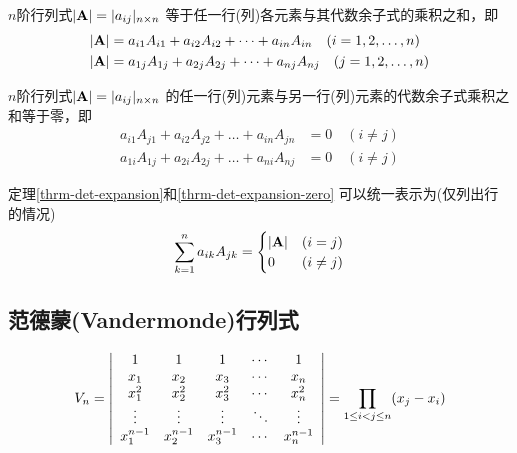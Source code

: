 \begin{theorem}[按行(列)展开] \label{thrm-det-expansion}
  $n$阶行列式$|\mmA|=|a_{ij}|_{n\times n}$
  等于任一行(列)各元素与其代数余子式的乘积之和，即
  \begin{align*}
  |\mmA| &= a_{i1}A_{i1}+a_{i2}A_{i2}+\dots+a_{in}A_{in}\quad(i=1,2,\dots,n) \\
  |\mmA| &= a_{1j}A_{1j}+a_{2j}A_{2j}+\dots+a_{nj}A_{nj}\quad(j=1,2,\dots,n)
  \end{align*}
\end{theorem}

\begin{theorem} \label{thrm-det-expansion-zero}
  $n$阶行列式$|\mmA|=|a_{ij}|_{n\times n}$
  的任一行(列)元素与另一行(列)元素的代数余子式乘积之和等于零，即
  \begin{align*}
    a_{i1}A_{j1}+a_{i2}A_{j2}+\dots+a_{in}A_{jn} &= 0\quad(i\neq j) \\
    a_{1i}A_{1j}+a_{2i}A_{2j}+\dots+a_{ni}A_{nj} &= 0\quad(i\neq j)
  \end{align*}
\end{theorem}

\begin{remark}
  定理\ref{thrm-det-expansion}和\ref{thrm-det-expansion-zero}
  可以统一表示为(仅列出行的情况)
  \begin{displaymath}
  \sum_{k=1}^{n}a_{ik}A_{jk} = \begin{cases}
    |\mmA| & (i=j) \\
    0      & (i\neq j)
  \end{cases}
  \end{displaymath}
\end{remark}

\subsection{范德蒙(Vandermonde)行列式}
\begin{displaymath}
  V_n = \mdet{ccccc}{
    1         & 1         & 1         & \cdots & 1      \\
    x_1       & x_2       & x_3       & \cdots & x_n    \\
    x_1^2     & x_2^2     & x_3^2     & \cdots & x_n^2  \\
    \vdots    & \vdots    & \vdots    & \ddots & \vdots \\
    x_1^{n-1} & x_2^{n-1} & x_3^{n-1} & \cdots & x_n^{n-1} 
  } = \prod_{1\le i<j\le n}(x_j - x_i)
\end{displaymath}


